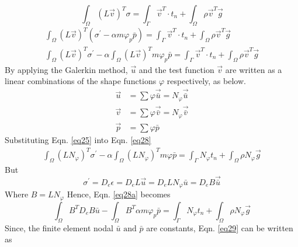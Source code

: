 \documentclass[12pt]{article}
\begin{document}
\begin{equation}	\label{eq27}
\int_\Omega(L\vec{v})^T\sigma=\int_\Gamma\vec{v}^T\cdot t_n+\int_\Omega\rho\vec{v}^T\vec{g}
\end{equation}
%
\begin{equation}	\label{eq28}
\begin{split}
\int_\Omega(L\vec{v})^T(\sigma^\prime-\alpha m \varphi_p\bar{p})=\int_\Gamma\vec{v}^T\cdot t_n+\int_\Omega\rho\vec{v}^T\vec{g}	\\
\int_\Omega(L\vec{v})^T\sigma^\prime-\alpha\int_\Omega(L\vec{v})^T m \varphi_p\bar{p}=\int_\Gamma\vec{v}^T\cdot t_n+\int_\Omega\rho\vec{v}^T\vec{g}
\end{split}
\end{equation}
%
By applying the Galerkin method, $\vec{u}$ and the test function $\vec{v}$ are written as a linear combinations of the shape functions ${\varphi}$ respectively, as below.
%
\begin{equation}	
\begin{split}	\label{eq25}
\vec{u} &= \sum \varphi \vec{\bar{u}}=N_{\varphi}\vec{\bar{u}}	\\
\vec{v} &= \sum \varphi \vec{\bar{v}}=N_{\varphi}\vec{\bar{v}}	\\
\vec{p} &= \sum \varphi \bar{p}
\end{split}
\end{equation}
%
Substituting Eqn. \ref{eq25} into Eqn. \ref{eq28}
%
\begin{equation}	\label{eq28a}
\begin{split}
\int_\Omega(LN_\varphi)^T\sigma^\prime-\alpha\int_\Omega(LN_\varphi)^T m \varphi\bar{p}=\int_\Gamma N_\varphi t_n+\int_\Omega\rho N_\varphi\vec{g}
\end{split}
\end{equation}
%
But
%
\begin{equation}
\sigma^\prime=D_e\epsilon=D_eL\vec{u}=D_eLN_{\varphi}\bar{u}=D_eB\vec{\bar{u}}
\end{equation}
%
\newline
Where $B=LN_{\varphi}$
\newline
\newline
Hence, Eqn. \ref{eq28a} becomes
%
\begin{equation}	\label{eq29}
\int_\Omega B^TD_eB\bar{u}-\int_\Omega B^T\alpha m \varphi_p\bar{p}=\int_\Gamma N_{\varphi} t_n+\int_\Omega\rho N_{\varphi}\vec{g}
\end{equation}
\newline
Since, the finite element nodal $\bar{u} \text{ and } \bar{p}$ are constants, Eqn. \ref{eq29} can be written as
\end{document}
